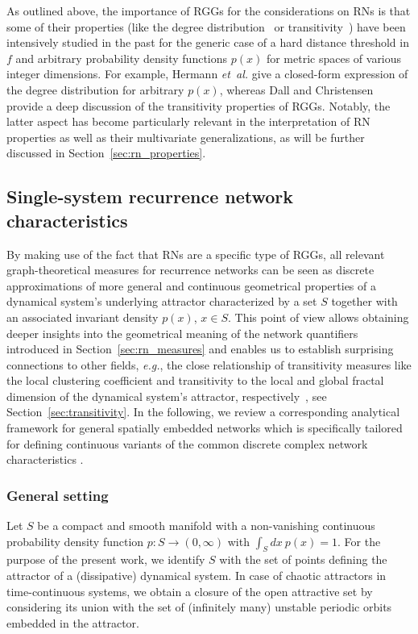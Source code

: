 \documentclass[graybox]{svmult}
\begin{document}
As outlined above, the importance of RGGs for the considerations on RNs is that some of their properties (like the degree distribution~\cite{Herrmann2003} or transitivity~\cite{Dall2002}) have been intensively studied in the past for the generic case of a hard distance threshold in $f$ and arbitrary probability density functions $p(x)$ for metric spaces of various integer dimensions. For example, Hermann \textit{et~al.} \cite{Herrmann2003} give a closed-form expression of the degree distribution for arbitrary $p(x)$, whereas Dall and Christensen~\cite{Dall2002} provide a deep discussion of the transitivity properties of RGGs. Notably, the latter aspect has become particularly relevant in the interpretation of RN properties as well as their multivariate generalizations, as will be further discussed in Section~\ref{sec:rn_properties}.


\subsection{Single-system recurrence network characteristics}\label{sec:rn_theory}

By making use of the fact that RNs are a specific type of RGGs, all relevant graph-theoretical measures for recurrence networks can be seen as discrete approximations of more general and continuous geometrical properties of a dynamical system's underlying attractor characterized by a set $S$ together with an associated invariant density $p(x)$, $x\in S$. This point of view allows obtaining deeper insights into the geometrical meaning of the network quantifiers introduced in Section~\ref{sec:rn_measures} and enables us to establish surprising connections to other fields, \textit{e.g.}, the close relationship of transitivity measures like the local clustering coefficient and transitivity to the local and global fractal dimension of the dynamical system's attractor, respectively~\cite{Donner2011EPJB}, see Section~\ref{sec:transitivity}. In the following, we review a corresponding analytical framework for general spatially embedded networks which is specifically tailored for defining continuous variants of the common discrete complex network characteristics \cite{Donges2012PRE}.


\subsubsection{General setting}

Let $S$ be a compact and smooth manifold with a non-vanishing continuous probability density function $p:S\to(0,\infty)$ with $\int_S dx\ p(x) = 1$. For the purpose of the present work, we identify $S$ with the set of points defining the attractor of a (dissipative) dynamical system. In case of chaotic attractors in time-continuous systems, we obtain a closure of the open attractive set by considering its union with the set of (infinitely many) unstable periodic orbits embedded in the attractor.
\end{document}
